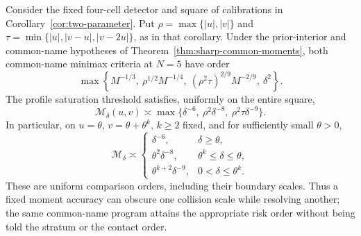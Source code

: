 \begin{corollary}
\label{cor:uncertain-intersections}
Consider the fixed four-cell detector and square of calibrations in
Corollary~\ref{cor:two-parameter}. Put
$\rho=\max\{|u|,|v|\}$ and
$\tau=\min\{|u|,|v-u|,|v-2u|\}$, as in that corollary.
Under the prior-interior and common-name hypotheses of
Theorem~\ref{thm:sharp-common-moments}, both common-name minimax
criteria at $N=5$ have order
\begin{equation}\label{eq:noisy-intersection-risk}
 \max\left\{M^{-1/3},\ \rho^{1/2}M^{-1/4},\
              (\rho^2\tau)^{2/9}M^{-2/9},\ \delta^2\right\}.
\end{equation}
The profile saturation threshold satisfies, uniformly on the entire square,
\begin{equation}\label{eq:noisy-intersection-threshold}
 \mathcal M_\delta(u,v)\asymp
 \max\{\delta^{-6},\ \rho^2\delta^{-8},\ \rho^2\tau\delta^{-9}\}.
\end{equation}
In particular, on $u=\theta$, $v=\theta+\theta^k$, $k\ge2$ fixed,
and for sufficiently small $\theta>0$,
\begin{equation}\label{eq:noisy-tangency-phases}
 \mathcal M_\delta\asymp
 \begin{cases}
   \delta^{-6},&\delta\ge\theta,\\
   \theta^2\delta^{-8},&\theta^k\le\delta\le\theta,\\
   \theta^{k+2}\delta^{-9},&0<\delta\le\theta^k.
 \end{cases}
\end{equation}
These are uniform comparison orders, including their boundary scales.
Thus a fixed moment accuracy can obscure one collision scale while
resolving another; the same common-name program attains the appropriate
risk order without being told the stratum or the contact order.
\end{corollary}
